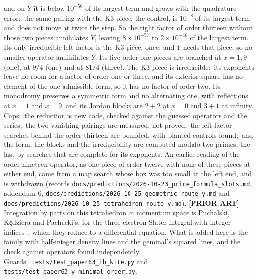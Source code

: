 \documentclass[aps,pra,twocolumn,superscriptaddress,longbibliography]{revtex4-2}
\begin{document}
and on $Y$ it is below $10^{-56}$ of its largest term and grows with the
quadrature error;\ the same pairing with the K3 piece, the control, is
$10^{-8}$ of its largest term and does not move at twice the step.  So the
right factor of order thirteen without those two pieces annihilates $Y$,
leaving $8\times10^{-57}$ to $2\times10^{-46}$ of the largest term.  Its only
irreducible left factor is the K3 piece, once, and $Y$ needs that piece, so no
smaller operator annihilates $Y$.  Its five order-one pieces are branched at
$x=1,9$ (one), at $9/4$ (one) and at $81/4$ (three).  The K3 piece is
irreducible:\ its exponents leave no room for a factor of order one or three,
and its exterior square has no element of the one admissible form, so it has
no factor of order two.  Its monodromy preserves a symmetric form and no
alternating one, with reflections at $x=1$ and $x=9$, and its Jordan blocks
are $2+2$ at $x=0$ and $3+1$ at infinity.  Caps:\ the reduction is new code,
checked against the guessed operators and the series;\ the two vanishing
pairings are measured, not proved;\ the left-factor searches behind the order
thirteen are bounded, with planted controls found;\ and the form, the blocks
and the irreducibility are computed modulo two primes, the last by searches
that are complete for its exponents.
An earlier reading of the order-nineteen operator, as one piece of order twelve
with none of these pieces at either end, came from a map search whose box was
too small at the left end, and is withdrawn (records
\texttt{docs/predictions/2026-10-23\_price\_formula\_slots.md}, addendum 6,
\texttt{docs/predictions/2026-10-25\_geometric\_route\_y.md} and
\texttt{docs/predictions/2026-10-25\_tetrahedron\_route\_y.md}).
\textbf{[PRIOR ART]} Integration by parts on
this tetrahedron in momentum space is Puchalski, K\c{e}dziera and
Pachucki's, for the three-electron Slater integral with integer
indices~\cite{pkp2009}, which they reduce to a differential equation.  What
is added here is the family with half-integer density lines and the
geminal's squared lines, and the check against operators found
independently.  Guards:\ \texttt{tests/test\_paper63\_ib\_kite.py} and
\texttt{tests/test\_paper63\_y\_minimal\_order.py}.
\end{document}
